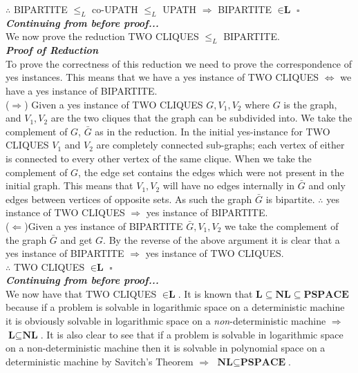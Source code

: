 \documentclass[12pt]{article}
\begin{document}
\begin{enumerate}
\begin{enumerate}
$\therefore $ BIPARTITE $\leq_{L} $ co-UPATH $\leq_{L} $ UPATH $\Rightarrow $ BIPARTITE $\in \textbf{L} $ $\square $\\
\textit{\textbf{Continuing from before proof...}}\\
We now prove the reduction TWO CLIQUES $\leq _{L}$ BIPARTITE. \\ 
\textit{\textbf{Proof of Reduction}}\\  
To prove the correctness of this reduction we need to prove the correspondence of yes instances. This means that we have a yes instance of TWO CLIQUES $\iff $ we have a yes instance of BIPARTITE.\\
($\Rightarrow $) Given a yes instance of TWO CLIQUES $G, V_1, V_2$ where $G$ is the graph, and $V_1,V_2$ are the two cliques that the graph can be subdivided into. We take the complement of $G$, $\bar{G}$ as in the reduction. In the initial yes-instance for TWO CLIQUES $V_1$ and $V_2$ are  completely connected sub-graphs; each vertex of either is connected to every other vertex of the same clique. When we take the complement of $G$, the edge set contains the edges which were not present in the initial graph. This means that $V_1,V_2$ will have no edges internally in $\bar{G}$ and only edges between vertices of opposite sets. As such the graph $\bar{G}$ is bipartite. $\therefore $ yes instance of TWO CLIQUES $\Rightarrow $  yes instance of BIPARTITE.
\\
($\Leftarrow $)Given a yes instance of BIPARTITE $\bar{G}, V_1, V_2 $ we take the complement of the graph $\bar{G} $ and get $G$. By the reverse of the above argument it is clear that a yes instance of BIPARTITE $\Rightarrow $ yes instance of TWO CLIQUES.
\\
$\therefore $ TWO CLIQUES $\in \textbf{L} $ $\square $ \\
\textit{\textbf{Continuing from before proof...}}\\  
We now have that TWO CLIQUES $\in \textbf{L}$. It is known that $\textbf{L} \subseteq \textbf{NL} \subseteq \textbf{PSPACE} $ because if a problem is solvable in logarithmic space on a deterministic machine it is obviously solvable in logarithmic space on a \textit{non}-deterministic machine $\Rightarrow $ $\textbf{L} \subseteq \textbf{NL} $. It is also clear to see that if a problem is solvable in logarithmic space on a non-deterministic machine then it is solvable in polynomial space on a deterministic machine by Savitch's Theorem $\Rightarrow$  $\textbf{NL} \subseteq \textbf{PSPACE} $. \\

\end{enumerate}
\end{enumerate}
\end{document}
